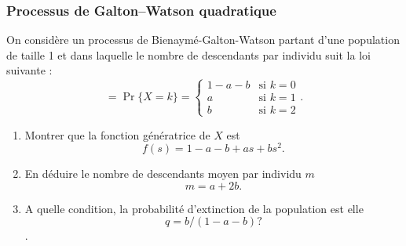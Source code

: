 \subsubsection{Processus de Galton–Watson quadratique \todo{}} %
  On considère un processus de Bienaymé-Galton-Watson partant d'une population de taille 1 et dans laquelle le nombre de descendants par individu suit la loi suivante :
  $$=
  \Pr\{X = k\} = \left\{
    \begin{array}{ll}
      1 - a - b & \text{si $k = 0$} \\
      a & \text{si $k = 1$} \\
      b & \text{si $k = 2$}
    \end{array}\right..
  $$
  \begin{enumerate}
    \item Montrer que la fonction génératrice de $X$ est
    $$
    f(s) = 1 - a - b + as + bs^2.
    $$
    \solution{\todo{}}
    \item En déduire le nombre de descendants moyen par individu $m$
    $$
    m = a + 2b.
    $$
    \item A quelle condition, la probabilité d'extinction de la population est elle
    $$
    q = b/(1 - a - b) ?
    $$
    .
  \end{enumerate}
